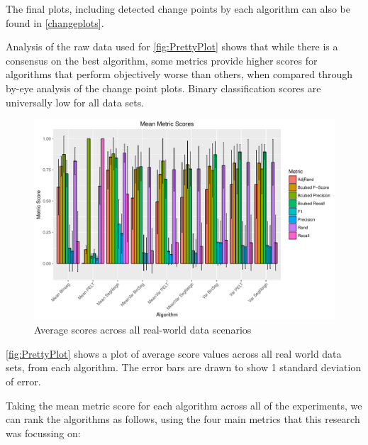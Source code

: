\documentclass{uvamscse}	%
\begin{document}
The final plots, including detected change points by each algorithm can also be found in \autoref{changeplots}.

Analysis of the raw data used for \autoref{fig:PrettyPlot} shows that while there is a consensus on the best algorithm, some metrics provide higher scores for algorithms that perform objectively worse than others, when compared through by-eye analysis of the change point plots. Binary classification scores are universally low for all data sets.

\begin{figure}[h]
    \includegraphics[width=\textwidth]{figures/PrettyPlot}
    \caption{Average scores across all real-world data scenarios}
    \label{fig:PrettyPlot}
\end{figure}

\autoref{fig:PrettyPlot} shows a plot of average score values across all real world data sets, from each algorithm. The error bars are drawn to show 1 standard deviation of error.

Taking the mean metric score for each algorithm across all of the experiments, we can rank the algorithms as follows, using the four main metrics that this research was focussing on:
\end{document}
